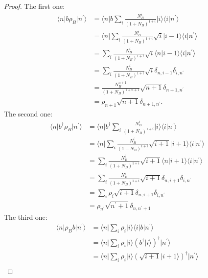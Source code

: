 \documentclass[../../note.tex]{subfiles}
\begin{document}
\begin{proof}
    The first one:
    \begin{align}
        \langle n \vert b \rho_B \vert n^\prime \rangle 
        &= \langle n \vert b \sum_i \frac{N_B^i}{(1 + N_B)^{1+i}} \vert i \rangle \langle i \vert n^\prime \rangle \\
        &= \langle n \vert \sum_i \frac{N_B^i}{(1+N_B)^{1+i}} \sqrt{i} \vert i-1 \rangle \langle i \vert n^\prime \rangle \\
        &= \sum_i \frac{N_B^i}{(1 + N_B)^{1+i}} \sqrt{i} \langle n \vert i-1 \rangle \langle i \vert n^\prime \rangle \\
        &= \sum_i \frac{N_B^i}{(1 + N_B)^{1+i}} \sqrt{i} \delta_{n, i-1} \delta_{i, n^\prime} \\
        &= \frac{N_B^{n+1}}{(1 + N_B)^{1 + n+1}} \sqrt{n+1} \delta_{n+1, n^\prime} \\
        &= \rho_{n+1} \sqrt{n+1} \delta_{n+1, n^\prime}.
    \end{align}
    The second one:
    \begin{align}
        \langle n \vert b^\dagger \rho_B \vert n^\prime \rangle 
        &= \langle n \vert b^\dagger \sum_i \frac{N_B^i}{(1 + N_B)^{1+i}} \vert i \rangle \langle i \vert n^\prime \rangle \\
        &= \langle n \vert \sum_i \frac{N_B^i}{(1+N_B)^{1+i}} \sqrt{i+1} \vert i+1 \rangle \langle i \vert n^\prime \rangle \\
        &= \sum_i \frac{N_B^i}{(1 + N_B)^{1+i}} \sqrt{i+1} \langle n \vert i+1 \rangle \langle i \vert n^\prime \rangle \\
        &= \sum_i \frac{N_B^i}{(1 + N_B)^{1+i}} \sqrt{i+1} \delta_{n, i+1} \delta_{i, n^\prime} \\
        &= \sum_i \rho_i \sqrt{i+1} \delta_{n, i+1} \delta_{i, n^\prime} \\
        &= \rho_{n^\prime} \sqrt{n^\prime + 1} \delta_{n, n^\prime + 1}
    \end{align}
    The third one:
    \begin{align}
        \langle n \vert \rho_B b \vert n^\prime \rangle 
        &= \langle n \vert \sum_i \rho_i \vert i \rangle \langle i \vert b \vert n^\prime \rangle \\
        &= \langle n \vert \sum_i \rho_i \vert i \rangle (b^\dagger \vert i \rangle)^\dagger \vert n^\prime \rangle \\
        &= \langle n \vert \sum_i \rho_i \vert i \rangle (\sqrt{i+1} \vert i + 1\rangle)^\dagger \vert n^\prime \rangle \\

\end{align}
\end{proof}
\end{document}
